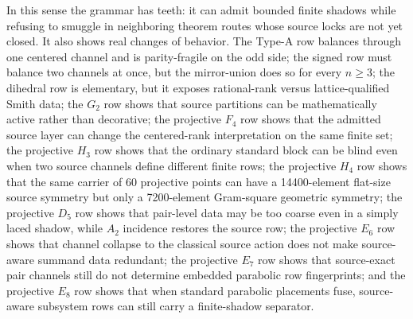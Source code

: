 In this sense the grammar has teeth: it can admit bounded finite shadows while refusing to smuggle in neighboring theorem routes whose source locks are not yet closed.  It also shows real changes of behavior.  The Type-A row balances through one centered channel and is parity-fragile on the odd side; the signed row must balance two channels at once, but the mirror-union does so for every \(n\geq3\); the dihedral row is elementary, but it exposes rational-rank versus lattice-qualified Smith data; the \(G_2\) row shows that source partitions can be mathematically active rather than decorative; the projective \(F_4\) row shows that the admitted source layer can change the centered-rank interpretation on the same finite set; the projective \(H_3\) row shows that the ordinary standard block can be blind even when two source channels define different finite rows; the projective \(H_4\) row shows that the same carrier of 60 projective points can have a 14400-element flat-size source symmetry but only a 7200-element Gram-square geometric symmetry; the projective \(D_5\) row shows that pair-level data may be too coarse even in a simply laced shadow, while \(A_2\) incidence restores the source row; the projective \(E_6\) row shows that channel collapse to the classical source action does not make source-aware summand data redundant; the projective \(E_7\) row shows that source-exact pair channels still do not determine embedded parabolic row fingerprints; and the projective \(E_8\) row shows that when standard parabolic placements fuse, source-aware subsystem rows can still carry a finite-shadow separator.
